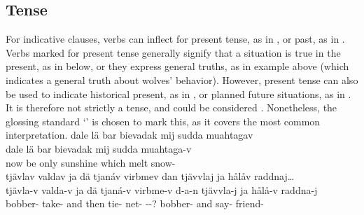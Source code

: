 \subsection{Tense}\label{tense}
For indicative clauses, verbs can inflect for present tense, as in , or past, as in . %
Verbs marked for present tense generally signify that a situation is true in the present, as in  below, or they express general truths, as in example  above (which indicates a general truth about wolves’ behavior). However, present tense can also be used to indicate historical present, as in , or planned future situations, as in . It is therefore not strictly a  tense, and could be considered . %
Nonetheless, the glossing standard ‘\PRSs’ is chosen to mark this, as it covers the most common interpretation. %
\ea\label{presentEx1}%
\glll	dale lä bar bievadak mij sudda muahtagav\\
	dale lä bar bievadak mij sudda muahtaga-v\\
	now be\BS{} only sunshine\BS{} which\BS{} melt\BS{} snow-\\\nopagebreak
{}	
\z
\ea\label{presentEx2}%
\glll	tjävlav valdav ja dä tjanáv virbmev dan tjävvlaj ja hålåv raddnaj…\\
	tjävla-v valda-v ja dä tjaná-v virbme-v d-a-n tjävvla-j ja hålå-v raddna-j\\
	bobber- take- and then tie- net- --? bobber- and say- friend-\\\nopagebreak
{} 	
